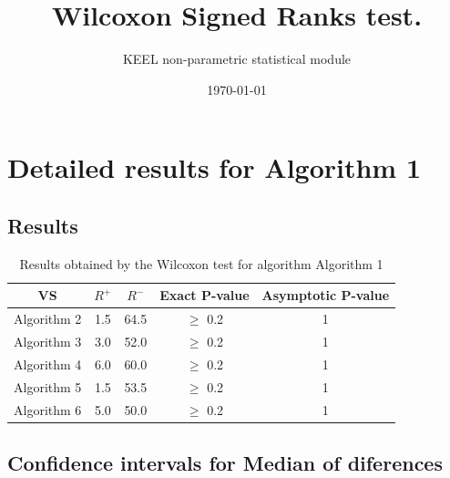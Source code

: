 \documentclass[a4paper,10pt]{article}
\title{Wilcoxon Signed Ranks test.}
\date{\today}
\author{KEEL non-parametric statistical module}
\begin{document}
\pagestyle{empty}
\maketitle
\thispagestyle{empty}



\section{Detailed results for Algorithm 1}


\subsection{Results}

\begin{table}[!htp]
\centering\small
\begin{tabular}{
|c|c|c|c|c|}
\hline
 VS & $R^{+}$ & $R^{-}$ & Exact P-value & Asymptotic P-value \\ \hline 
Algorithm 2 & 1.5 & 64.5 & $\geq$ 0.2 & 1\\ \hline 
Algorithm 3 & 3.0 & 52.0 & $\geq$ 0.2 & 1\\ \hline 
Algorithm 4 & 6.0 & 60.0 & $\geq$ 0.2 & 1\\ \hline 
Algorithm 5 & 1.5 & 53.5 & $\geq$ 0.2 & 1\\ \hline 
Algorithm 6 & 5.0 & 50.0 & $\geq$ 0.2 & 1\\ \hline 

\end{tabular}
\caption{Results obtained by the Wilcoxon test for algorithm Algorithm 1}
\end{table}

\subsection{Confidence intervals for Median of diferences}
\end{document}
